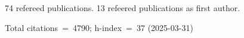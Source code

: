 74 refereed publications. 13 refeered publications as first author.

Total citations~=~4790; h-index~=~37 (2025-03-31)